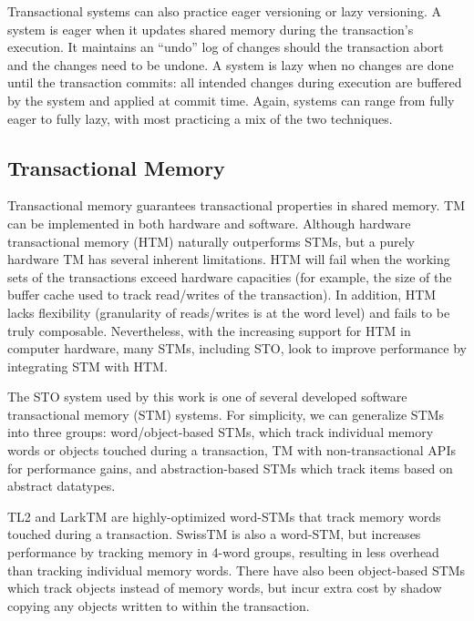 Transactional systems can also practice eager versioning or lazy versioning. A system is eager when it updates shared memory during the transaction's execution. It maintains an ``undo'' log of changes should the transaction abort and the changes need to be undone. A system is lazy when no changes are done until the transaction commits: all intended changes during execution are buffered by the system and applied at commit time. Again, systems can range from fully eager to fully lazy, with most practicing a mix of the two techniques.

\subsection{Transactional Memory}
Transactional memory\cite{harristm}\cite{herlihytm} guarantees transactional properties in shared memory. TM can be implemented in both hardware and software. Although hardware transactional memory (HTM) naturally outperforms STMs, but a purely hardware TM has several inherent limitations. HTM will fail when the working sets of the transactions exceed hardware capacities (for example, the size of the buffer cache used to track read/writes of the transaction). In addition, HTM lacks flexibility (granularity of reads/writes is at the word level) and fails to be truly composable\cite{htm}. Nevertheless, with the increasing support for HTM in computer hardware, many STMs, including STO, look to improve performance by integrating STM with HTM.

The STO system\cite{sto} used by this work is one of several developed software transactional memory (STM) systems. For simplicity, we can generalize STMs into three groups: word/object-based STMs, which track individual memory words or objects touched during a transaction, TM with non-transactional APIs for performance gains, and abstraction-based STMs which track items based on abstract datatypes.

TL2\cite{tl2} and LarkTM\cite{larktm} are highly-optimized word-STMs that track memory words touched during a transaction. SwissTM\cite{swisstm} is also a word-STM, but increases performance by tracking memory in 4-word groups, resulting in less overhead than tracking individual memory words. There have also been object-based STMs which track objects instead of memory words, but incur extra cost by shadow copying any objects written to within the transaction. 


